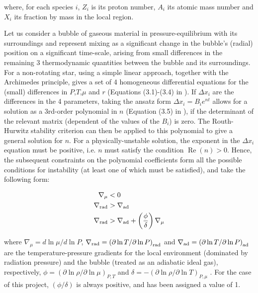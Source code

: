 \documentclass[usenatbib]{mnras}
\begin{document}
where, for each species $i$, $Z_{i}$ is its proton number, $A_{i}$ its atomic mass number and $X_{i}$ its fraction by mass in the local region.

Let us consider a bubble of gaseous material in pressure-equilibrium with its surroundings and represent mixing as a significant change in the bubble's (radial) position on a significant time-scale, arising from small differences in the remaining 3 thermodynamic quantities between the bubble and its surroundings. For a non-rotating star, using a simple linear approach, together with the Archimedes principle, gives a set of 4 homogeneous differential equations for the (small) differences in $P$,$T$,$\mu$ and $r$ (Equations (3.1)-(3.4) in \citet{2017RSOS....470192S}). If $\Delta x_{i}$ are the differences in the 4 parameters, taking the ansatz form $\Delta x_{i} = B_{i} e^{nt}$ allows for a solution as a 3rd-order polynomial in $n$ (Equation (3.5) in \citet{2017RSOS....470192S}), if the determinant of the relevant matrix (dependent of the values of the $B_{i}$) is zero. The Routh-Hurwitz stability criterion can then be applied to this polynomial to give a general solution for $n$. For a physically-unstable solution, the exponent in the $\Delta x_{i}$ equation must be positive, i.e. $n$ must satisfy the condition $\operatorname{Re}(n) > 0$. Hence, the subsequent constraints on the polynomial coefficients form all the possible conditions for instability (at least one of which must be satisfied), and take the following form:

\begin{align}
\nabla _{\mu} &< 0 \label{mu_inv_ineq} \\
\nabla _{\textnormal{rad}} &> \nabla _{\textnormal{ad}} \label{schwarz_ineq} \\
\nabla _{\textnormal{rad}} &> \nabla _{\textnormal{ad}} + \left( \frac{\phi}{\delta} \right) \nabla _{\mu} \label{ledoux_ineq}
\end{align}

where $\nabla _{\mu} = d\ln\mu / d\ln P$, $\nabla _{\textnormal{rad}} = \left(\partial\ln T / \partial\ln P \right)_{\textnormal{rad}}$ and $\nabla _{\textnormal{ad}} = \left(\partial\ln T / \partial\ln P \right)_{\textnormal{ad}}$ are the temperature-pressure gradients for the local environment (dominated by radiation pressure) and the bubble (treated as an adiabatic ideal gas), respectively, $\phi = \left( \partial \ln\rho / \partial \ln\mu \right)_{P,T}$ and $\delta = -\left( \partial \ln\rho / \partial \ln T \right)_{P,\mu}$  \citep{1980A&A....91..175K}. For the case of this project, $(\phi/\delta)$ is always positive, and has been assigned a value of 1.
\end{document}
